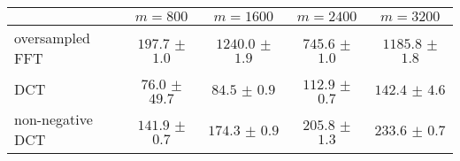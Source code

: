 \centering
\renewcommand{\arraystretch}{1.2}
\begin{tabular}{@{}lcccc@{}}
\toprule
 & $m=800$ & $m=1600$ & $m=2400$ & $m=3200$\\
\midrule
oversampled FFT & $197.7$ $\pm$ $1.0$ & $1240.0$ $\pm$ $1.9$ & $745.6$ $\pm$ $1.0$ & $1185.8$ $\pm$ $1.8$ \\
DCT & $76.0$ $\pm$ $49.7$ & $84.5$ $\pm$ $0.9$ & $112.9$ $\pm$ $0.7$ & $142.4$ $\pm$ $4.6$ \\
non-negative DCT & $141.9$ $\pm$ $0.7$ & $174.3$ $\pm$ $0.9$ & $205.8$ $\pm$ $1.3$ & $233.6$ $\pm$ $0.7$ \\
\bottomrule
\end{tabular}

